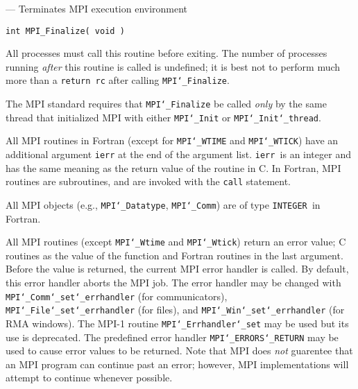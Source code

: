 \startmanpage
{}
--- Terminates MPI execution environment 
\startvb\begin{verbatim}
int MPI_Finalize( void )

\end{verbatim}
\endvb

All processes must call this routine before exiting.  The number of
processes running {\em after} this routine is called is undefined;
it is best not to perform much more than a {\tt return rc} after calling
{\tt MPI{\tt \char`\_}Finalize}.
\par
{}
The MPI standard requires that {\tt MPI{\tt \char`\_}Finalize} be called {\em only} by the same
thread that initialized MPI with either {\tt MPI{\tt \char`\_}Init} or {\tt MPI{\tt \char`\_}Init{\tt \char`\_}thread}.
\par
{}
All MPI routines in Fortran (except for {\tt MPI{\tt \char`\_}WTIME} and {\tt MPI{\tt \char`\_}WTICK}) have
an additional argument {\tt ierr} at the end of the argument list.  {\tt ierr
}is an integer and has the same meaning as the return value of the routine
in C.  In Fortran, MPI routines are subroutines, and are invoked with the
{\tt call} statement.
\par
All MPI objects (e.g., {\tt MPI{\tt \char`\_}Datatype}, {\tt MPI{\tt \char`\_}Comm}) are of type {\tt INTEGER
}in Fortran.
\par
{}
\par
All MPI routines (except {\tt MPI{\tt \char`\_}Wtime} and {\tt MPI{\tt \char`\_}Wtick}) return an error value;
C routines as the value of the function and Fortran routines in the last
argument.  Before the value is returned, the current MPI error handler is
called.  By default, this error handler aborts the MPI job.  The error handler
may be changed with {\tt MPI{\tt \char`\_}Comm{\tt \char`\_}set{\tt \char`\_}errhandler} (for communicators),
{\tt MPI{\tt \char`\_}File{\tt \char`\_}set{\tt \char`\_}errhandler} (for files), and {\tt MPI{\tt \char`\_}Win{\tt \char`\_}set{\tt \char`\_}errhandler} (for
RMA windows).  The MPI-1 routine {\tt MPI{\tt \char`\_}Errhandler{\tt \char`\_}set} may be used but
its use is deprecated.  The predefined error handler
{\tt MPI{\tt \char`\_}ERRORS{\tt \char`\_}RETURN} may be used to cause error values to be returned.
Note that MPI does {\em not} guarentee that an MPI program can continue past
an error; however, MPI implementations will attempt to continue whenever
possible.
\par
{}
\endmanpage
